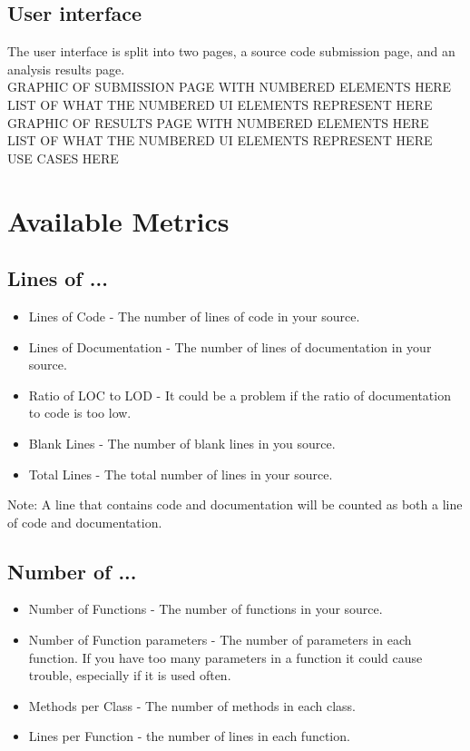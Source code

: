 \documentclass{scrreprt}
\begin{document}
	\section{User interface}
	The user interface is split into two pages, a source code submission page, and an analysis results page. \\
	
	GRAPHIC OF SUBMISSION PAGE WITH NUMBERED ELEMENTS HERE \\
	
	LIST  OF WHAT THE NUMBERED UI ELEMENTS REPRESENT HERE \\
	
	GRAPHIC OF RESULTS PAGE WITH NUMBERED ELEMENTS HERE \\
	
	LIST  OF WHAT THE NUMBERED UI ELEMENTS REPRESENT HERE \\
	
	USE CASES HERE \\
	

	{\let\clearpage\relax \chapter{Available Metrics}}
	
	\section{Lines of ...}
	\begin{itemize}
		\item Lines of Code - The number of lines of code in your source.
		\item Lines of Documentation - The number of lines of documentation in your source.
		\item Ratio of LOC to LOD - It could be a problem if the ratio of documentation to code is too low.
		\item Blank Lines - The number of blank lines in you source.
		\item Total Lines - The total number of lines in your source.
	\end{itemize}
	Note: A line that contains code and documentation will be counted as both a line of code and documentation.
	
	\section{Number of ...}
	\begin{itemize}
		\item Number of Functions - The number of functions in your source.
		\item Number of Function parameters - The number of parameters in each function. If you have too many parameters in a function it could cause trouble, especially if it is used often.
		\item Methods per Class - The number of methods in each class.
		\item Lines per Function - the number of lines in each function.
	\end{itemize}
	
\end{document}
